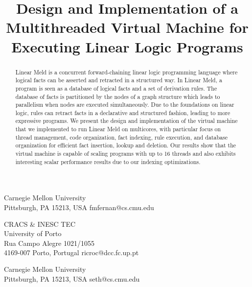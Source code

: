 \documentclass{sigplanconf}
\begin{document}
\setlength{\pdfpageheight}{\paperheight}
\setlength{\pdfpagewidth}{\paperwidth}

\exclusivelicense                                                                                                                      

\title{Design and Implementation of a Multithreaded Virtual Machine for Executing Linear Logic Programs}

           {Carnegie Mellon University\\Pittsburgh, PA 15213, USA}
           {fmfernan@cs.cmu.edu}

           {CRACS \& INESC TEC\\University of Porto\\Rua Campo Alegre 1021/1055\\4169-007 Porto, Portugal}
           {ricroc@dcc.fc.up.pt}

           {Carnegie Mellon University\\Pittsburgh, PA 15213, USA}
           {seth@cs.cmu.edu}


\maketitle

\makeatletter{}\begin{abstract}
Linear Meld is a concurrent forward-chaining linear logic programming
language where logical facts can be asserted and retracted in a
structured way. In Linear Meld, a program is seen as a database of
logical facts and a set of derivation rules. The database of facts is
partitioned by the nodes of a graph structure which leads to
parallelism when nodes are executed simultaneously. Due to the
foundations on linear logic, rules can retract facts in a declarative
and structured fashion, leading to more expressive programs. We
present the design and implementation of the virtual machine that we
implemented to run Linear Meld on multicores, with particular focus on
thread management, code organization, fact indexing, rule execution,
and database organization for efficient fact insertion, lookup and
deletion. Our results show that the virtual machine is
capable of scaling programs with up to 16 threads and also exhibits
interesting scalar performance results due to our indexing optimizations.
\end{abstract}
\end{document}

